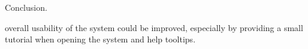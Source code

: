 
Conclusion.

overall usability of the system could be improved, especially by providing a small tutorial when opening the system and help tooltips.